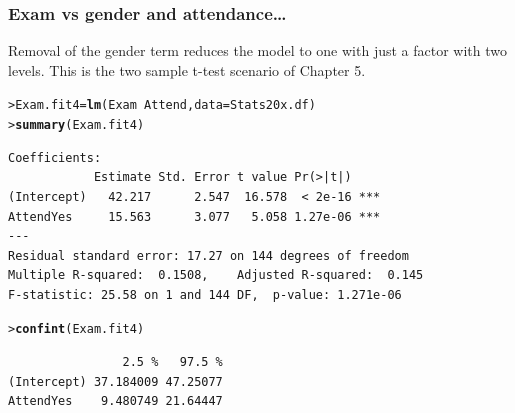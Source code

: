 \documentclass{beamer}\usepackage[]{graphicx}\usepackage[]{xcolor}
\makeatletter
\newcommand{\hlopt}[1]{\textcolor[rgb]{0,0,0}{#1}}%
\newcommand{\hlstd}[1]{\textcolor[rgb]{0.345,0.345,0.345}{#1}}%
\newcommand{\hlkwb}[1]{\textcolor[rgb]{0.69,0.353,0.396}{#1}}%
\newcommand{\hlkwc}[1]{\textcolor[rgb]{0.333,0.667,0.333}{#1}}%
\newcommand{\hlkwd}[1]{\textcolor[rgb]{0.737,0.353,0.396}{\textbf{#1}}}%
\newenvironment{kframe}{%
 \def\at@end@of@kframe{}%
 \ifinner\ifhmode%
  \def\at@end@of@kframe{\end{minipage}}%
  \begin{minipage}{\columnwidth}%
 \fi\fi%
 \def\FrameCommand##1{\hskip\@totalleftmargin \hskip-\fboxsep
 \colorbox{shadecolor}{##1}\hskip-\fboxsep
     \hskip-\linewidth \hskip-\@totalleftmargin \hskip\columnwidth}%
 \MakeFramed {\advance\hsize-\width
   \@totalleftmargin\z@ \linewidth\hsize
   \@setminipage}}%
 {\par\unskip\endMakeFramed%
 \at@end@of@kframe}
\newenvironment{knitrout}{}{} %
\makeatother
\begin{document}
\begin{frame}[fragile]
\frametitle{Exam vs gender and attendance\ldots}
Removal of the gender term reduces the model to one with just a factor with two levels. This is the two sample t-test scenario of Chapter 5. 

\medskip

\begin{knitrout}\scriptsize
{}\color{fgcolor}\begin{kframe}
\begin{alltt}
\hlstd{> }\hlstd{Exam.fit4} \hlkwb{=} \hlkwd{lm}\hlstd{(Exam} \hlopt{~} \hlstd{Attend,} \hlkwc{data} \hlstd{= Stats20x.df)}
\hlstd{> }\hlkwd{summary}\hlstd{(Exam.fit4)}
\end{alltt}
\end{kframe}
\end{knitrout}

\begin{knitrout}\scriptsize
{}\color{fgcolor}\begin{kframe}
\begin{verbatim}
Coefficients:
            Estimate Std. Error t value Pr(>|t|)    
(Intercept)   42.217      2.547  16.578  < 2e-16 ***
AttendYes     15.563      3.077   5.058 1.27e-06 ***
---
Residual standard error: 17.27 on 144 degrees of freedom
Multiple R-squared:  0.1508,	Adjusted R-squared:  0.145 
F-statistic: 25.58 on 1 and 144 DF,  p-value: 1.271e-06
\end{verbatim}
\end{kframe}
\end{knitrout}

\begin{knitrout}\scriptsize
{}\color{fgcolor}\begin{kframe}
\begin{alltt}
\hlstd{> }\hlkwd{confint}\hlstd{(Exam.fit4)}
\end{alltt}
\begin{verbatim}
                2.5 %   97.5 %
(Intercept) 37.184009 47.25077
AttendYes    9.480749 21.64447
\end{verbatim}
\end{kframe}
\end{knitrout}
\end{frame}


\end{document}
